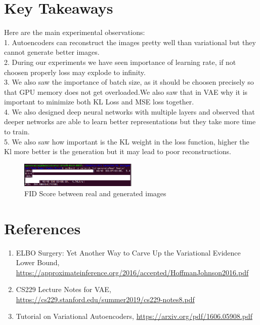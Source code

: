 \documentclass[10pt,a4paper]{article}
\begin{document}
\section{Key Takeaways}
Here are the main experimental observations: \\
1. Autoencoders can reconstruct the images pretty well than variational but they cannot generate better images. \\
2. During our experiments we have seen importance of learning rate, if not choosen properly loss may explode to infinity.\\
3. We also saw the importance of batch size, as it should be choosen precisely so that GPU memory does not get overloaded.We also saw that in VAE why it is important to minimize both KL Loss and MSE loss together.\\
4. We also designed deep neural networks with multiple layers and observed that deeper networks are able to learn better representations but they take more time to train.\\
5. We also saw how important is the KL weight in the loss function, higher the Kl more better is the generation but it may lead to poor reconstructions.

\begin{figure}
    \centering
    \includegraphics[width=0.5\textwidth]{FID.png}
    \caption{FID Score between real and generated images}
    \label{fig:my_label}
\end{figure}

\section{References}
\begin{enumerate}
    \item ELBO Surgery: Yet Another Way to Carve Up the Variational Evidence Lower Bound, \url{https://approximateinference.org/2016/accepted/HoffmanJohnson2016.pdf}
    \item CS229 Lecture Notes for VAE, \url{https://cs229.stanford.edu/summer2019/cs229-notes8.pdf}
    \item Tutorial on Variational Autoencoders, \url{https://arxiv.org/pdf/1606.05908.pdf}
\end{enumerate}
\end{document}
